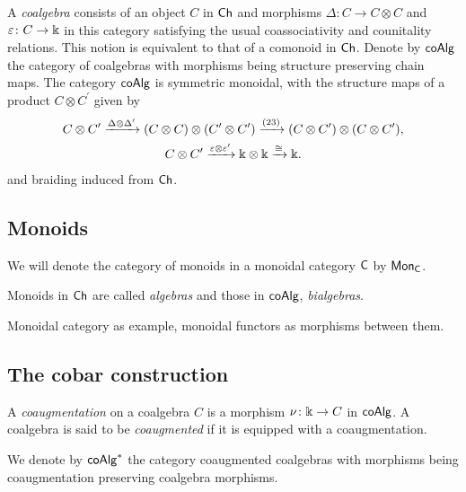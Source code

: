 A \textit{coalgebra} consists of an object $C$ in $\mathsf{Ch}$ and morphisms $\Delta \colon C \to C \otimes C$ and $\varepsilon \colon C \to \Bbbk$ in this category satisfying the usual coassociativity and counitality relations. 
This notion is equivalent to that of a comonoid in $\mathsf{Ch}$.
Denote by $\mathsf{coAlg}$ the category of coalgebras with morphisms being structure preserving chain maps.
The category $\mathsf{coAlg}$ is symmetric monoidal, with the structure maps of a product $C \otimes C^\prime$ given by
\begin{gather*}
C \otimes C^\prime \xrightarrow{\Delta \otimes \Delta^\prime}
(C \otimes C) \otimes (C^\prime \otimes C^\prime) \xrightarrow{(23)}
(C \otimes C^\prime) \otimes (C \otimes C^\prime), \\
C \otimes C^\prime \xrightarrow{\varepsilon \otimes \varepsilon^\prime}
\Bbbk \otimes \Bbbk \xrightarrow{\cong} \Bbbk.
\end{gather*}
and braiding induced from $\mathsf{Ch}$.

\subsection{Monoids}


We will denote the category of monoids in a monoidal category $\mathsf{C}$ by $\mathsf{Mon}_{\mathsf{C}}$.

Monoids in $\mathsf{Ch}$ are called \textit{algebras} and those in $\mathsf{coAlg}$, \textit{bialgebras}.

Monoidal category as example, monoidal functors as morphisms between them.

\subsection{The cobar construction}

A \textit{coaugmentation} on a coalgebra $C$ is a morphism $\nu \colon \Bbbk \to C$ in $\mathsf{coAlg}$. A coalgebra is said to be \textit{coaugmented} if it is equipped with a coaugmentation. 

We denote by $\mathsf{coAlg}^*$ the category coaugmented coalgebras with morphisms being coaugmentation preserving coalgebra morphisms.

